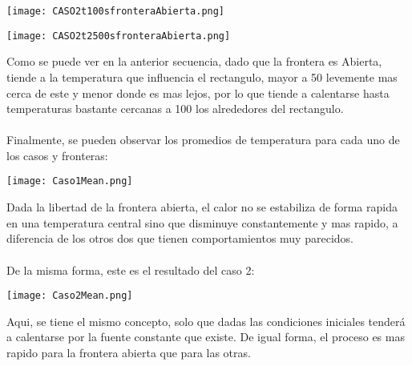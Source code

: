 \documentclass{article}
\begin{document}
\begin{center}
\texttt{[image: CASO2t100sfronteraAbierta.png]}
\end{center}

\begin{center}
\texttt{[image: CASO2t2500sfronteraAbierta.png]}
\end{center}
Como se puede ver en la anterior secuencia, dado que la frontera es Abierta, tiende a la temperatura que influencia el rectangulo, mayor a 50 levemente mas cerca de este y menor donde es mas lejos, por lo que tiende a calentarse hasta temperaturas bastante cercanas a 100 los alrededores del rectangulo.\\
\\
Finalmente, se pueden observar los promedios de temperatura para cada uno de los casos y fronteras:\\

\begin{center}
\texttt{[image: Caso1Mean.png]}
\end{center}
Dada la libertad de la frontera abierta, el calor no se estabiliza de forma rapida en una temperatura central sino que disminuye constantemente y mas rapido, a diferencia de los otros dos que tienen comportamientos muy parecidos.\\
\\
De la misma forma, este es el resultado del caso 2:
\begin{center}
\texttt{[image: Caso2Mean.png]}
\end{center}
Aqui, se tiene el mismo concepto, solo que dadas las condiciones iniciales tenderá a calentarse por la fuente constante que existe. De igual forma, el proceso es mas rapido para la frontera abierta que para las otras.
\end{document}
